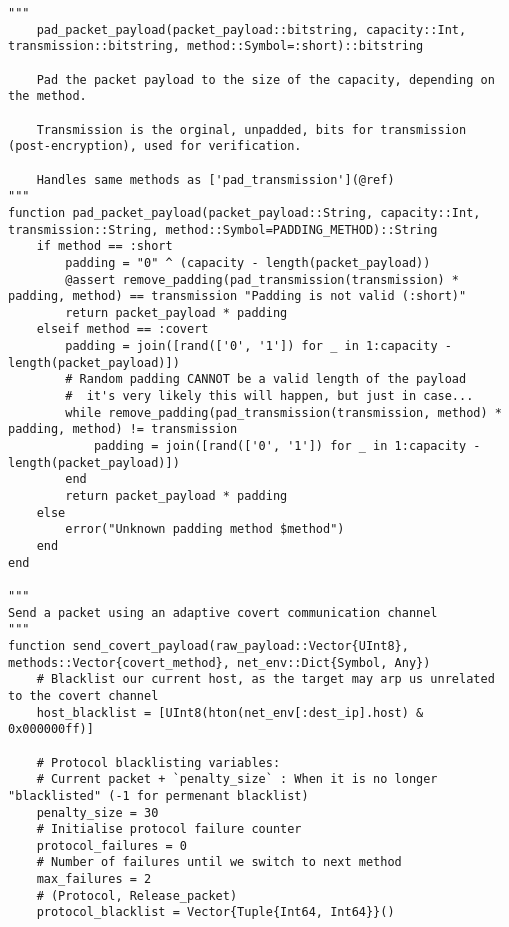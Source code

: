 \begin{lstlisting}[language=JuliaLocal, style=julia]
"""
    pad_packet_payload(packet_payload::bitstring, capacity::Int, transmission::bitstring, method::Symbol=:short)::bitstring

    Pad the packet payload to the size of the capacity, depending on the method.

    Transmission is the orginal, unpadded, bits for transmission (post-encryption), used for verification.

    Handles same methods as ['pad_transmission'](@ref)
"""
function pad_packet_payload(packet_payload::String, capacity::Int, transmission::String, method::Symbol=PADDING_METHOD)::String
    if method == :short
        padding = "0" ^ (capacity - length(packet_payload))
        @assert remove_padding(pad_transmission(transmission) * padding, method) == transmission "Padding is not valid (:short)"
        return packet_payload * padding
    elseif method == :covert
        padding = join([rand(['0', '1']) for _ in 1:capacity - length(packet_payload)])
        # Random padding CANNOT be a valid length of the payload
        #  it's very likely this will happen, but just in case...
        while remove_padding(pad_transmission(transmission, method) * padding, method) != transmission
            padding = join([rand(['0', '1']) for _ in 1:capacity - length(packet_payload)])
        end
        return packet_payload * padding
    else
        error("Unknown padding method $method")
    end
end

"""
Send a packet using an adaptive covert communication channel
"""
function send_covert_payload(raw_payload::Vector{UInt8}, methods::Vector{covert_method}, net_env::Dict{Symbol, Any})
    # Blacklist our current host, as the target may arp us unrelated to the covert channel
    host_blacklist = [UInt8(hton(net_env[:dest_ip].host) & 0x000000ff)]
    
    # Protocol blacklisting variables:
    # Current packet + `penalty_size` : When it is no longer "blacklisted" (-1 for permenant blacklist)
    penalty_size = 30
    # Initialise protocol failure counter
    protocol_failures = 0
    # Number of failures until we switch to next method
    max_failures = 2
    # (Protocol, Release_packet)
    protocol_blacklist = Vector{Tuple{Int64, Int64}}()


\end{lstlisting}
